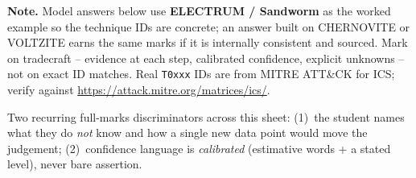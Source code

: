 \documentclass[11pt,a4paper]{article}
\begin{document}
\sheetheader

\noindent
\textbf{Note.} Model answers below use \textbf{ELECTRUM / Sandworm} as the worked example so
the technique IDs are concrete; an answer built on CHERNOVITE or VOLTZITE earns the same marks
if it is internally consistent and sourced. Mark on tradecraft -- evidence at each step,
calibrated confidence, explicit unknowns -- not on exact ID matches. Real \texttt{T0xxx} IDs
are from MITRE ATT\&CK for ICS; verify against \url{https://attack.mitre.org/matrices/ics/}.

\begin{hintbox}
Two recurring full-marks discriminators across this sheet: (1)~the student names what they
do \emph{not} know and how a single new data point would move the judgement; (2)~confidence
language is \emph{calibrated} (estimative words + a stated level), never bare assertion.
\end{hintbox}
\end{document}
